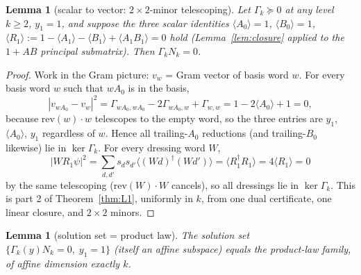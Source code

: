 \documentclass[11pt]{article}
\newtheorem{lemma}[theorem]{Lemma}
\newcommand{\la}{\langle}
\newcommand{\ra}{\rangle}
\begin{document}
\begin{lemma}[scalar to vector: $2\times2$-minor telescoping]
\label{lem:telescope}
Let $\Gamma_k\succeq0$ at any level $k\ge2$, $y_1=1$, and suppose the three
scalar identities $\la A_0\ra=1$, $\la B_0\ra=1$, $\la
R_1\ra:=1-\la A_1\ra-\la B_1\ra+\la A_1B_1\ra=0$ hold (Lemma~\ref{lem:closure}
applied to the $1{+}AB$ principal submatrix). Then $\Gamma_k N_k=0$.
\end{lemma}

\begin{proof}
Work in the Gram picture: $v_w$ = Gram vector of basis word $w$. For every
basis word $w$ such that $wA_0$ is in the basis,
\[
|v_{wA_0}-v_w|^2=\Gamma_{wA_0,wA_0}-2\Gamma_{wA_0,w}+\Gamma_{w,w}
=1-2\la A_0\ra+1=0,
\]
because $\mathrm{rev}(w)\cdot w$ telescopes to the empty word, so the three
entries are $y_1$, $\la A_0\ra$, $y_1$ regardless of $w$. Hence all
trailing-$A_0$ reductions (and trailing-$B_0$ likewise) lie in
$\ker\Gamma_k$. For every dressing word $W$,
\[
|W R_1\psi|^2=\sum_{d,d'}s_ds_{d'}\la (Wd)^\dagger(Wd')\ra
=\la R_1^\dagger R_1\ra=4\la R_1\ra=0
\]
by the same telescoping ($\mathrm{rev}(W)\cdot W$ cancels), so all
dressings lie in $\ker\Gamma_k$. This is part 2 of Theorem~\ref{thm:L1},
uniformly in $k$, from one dual certificate, one linear closure, and
$2\times2$ minors.
\end{proof}

\begin{lemma}[solution set = product law]\label{lem:hull}
The solution set $\{\Gamma_k(y)N_k=0,\;y_1=1\}$ (itself an affine
subspace) equals the product-law family, of affine dimension exactly $k$.
\end{lemma}
\end{document}
